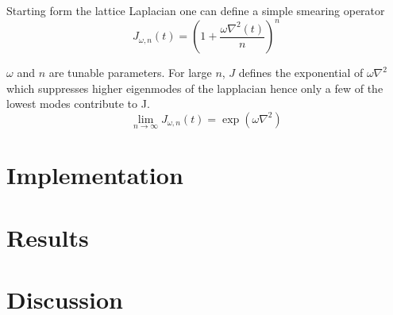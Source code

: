 \documentclass{style}
\begin{document}
	Starting form the lattice Laplacian one can define a simple smearing operator
	\begin{equation}
	    J_{\omega,n}(t) = (1+\frac{\omega\nabla^2(t)}{n})^n
	\end{equation}
	
	$\omega$ and $n$ are tunable parameters. For large $n$, $J$ defines the exponential of $\omega\nabla^2$ which suppresses higher eigenmodes of the lapplacian hence only a few of the lowest modes contribute to J. %
	\begin{equation}
        \lim_{n\rightarrow\infty} J_{\omega,n}(t) = \exp(\omega\nabla^2)
	\end{equation}
	
	
	\section{Implementation}
	
	\section{Results}
	
	\section{Discussion}
	
	
	
\end{document}
